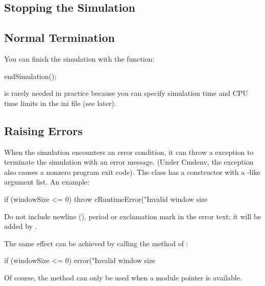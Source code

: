 \begin{ned}
\section{Stopping the Simulation}
\label{sec:simple-modules:stopping}

\subsection{Normal Termination}
\label{sec:simple-modules:endsimulation}

You can finish the simulation with the  function:

\begin{cpp}
endSimulation();
\end{cpp}

 is rarely needed in practice because you
can specify simulation time and CPU time limits
in the ini file (see later).

\subsection{Raising Errors}
\label{sec:simple-modules:raising-errors}

When the simulation encounters an error condition, it can throw a
 exception to terminate the simulation with an error
message. (Under Cmdenv, the exception also causes a nonzero program exit
code). The  class has a constructor with a
-like argument list. An example:

\begin{cpp}
if (windowSize <= 0)
    throw cRuntimeError("Invalid window size %
\end{cpp}

Do not include newline (), period or exclamation mark
in the error text; it will be added by {\opp}.

The same effect can be achieved by calling the  method of
:

\begin{cpp}
if (windowSize <= 0)
    error("Invalid window size %
\end{cpp}

Of course, the  method can only be used when a module pointer
is available.




\end{ned}
